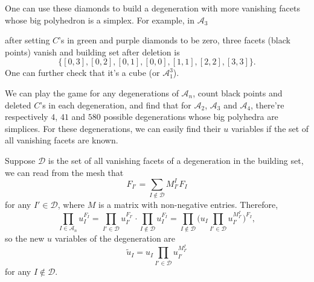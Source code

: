 \documentclass[hidelinks,12pt]{article}
\begin{document}
One can use these diamonds to build a degeneration with more vanishing facets whose big polyhedron is a simplex. For example, in $\mathscr A_3$
\begin{center}
\end{center}
after setting $C$'s in green and purple diamonds to be zero, three facets (black points) vanish and building set after deletion is 
\[
	\{[0,3],[0,2],[0,1],[0,0],[1,1],[2,2],[3,3]\}.
\]
One can further check that it's a cube (or $\mathscr A_1^3$).

We can play the game for any degenerations of $\mathscr A_n$, count black points and deleted $C$'s in each degeneration, and find that for $\mathscr A_2$, $\mathscr A_3$ and $\mathscr A_4$, there're respectively $4$, $41$ and $580$ possible degenerations whose big polyhedra are simplices. For these degenerations, we can easily find their $u$ variables if the set of all vanishing facets are known.

Suppose $\mathscr D$ is the set of all vanishing facets of a degeneration in the building set, 
we can read from the mesh that
\[
F_{I'}=\sum_{I\not\in \mathscr D}M_{I'}^IF_I
\]
for any $I'\in \mathscr D$, where $M$ is a matrix with non-negative entries. Therefore,
\[
\prod_{I\in \mathscr A_n}u_{I}^{F_{I}}=
\prod_{I'\in \mathscr D}u_{I'}^{F_{I'}}
\cdot
\prod_{I\not\in \mathscr D}u_{I}^{F_{I}}=
\prod_{I\not\in \mathscr D}\biggl(
u_I\prod_{I'\in \mathscr D}u_{I'}^{M_{I'}^I}
\bigg)^{F_I},
\]
so the new $u$ variables of the degeneration are
\begin{equation}
    \tilde u_{I}=u_I\prod_{I'\in \mathscr D}u_{I'}^{M_{I'}^I}
\end{equation}
for any $I\not\in \mathscr D$. 
\end{document}
